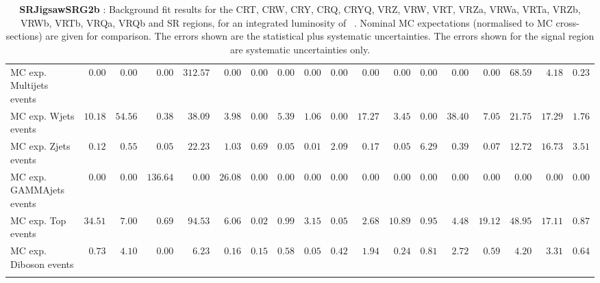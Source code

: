 \begin{table}
{\begin{tabular*}{\textwidth}{@{\extracolsep{\fill}}lrrrrrrrrrrrrrrrrr}
\noalign{\smallskip}\hline\noalign{\smallskip}
        MC exp. Multijets events         & $0.00$          & $0.00$          & $0.00$          & $312.57$          & $0.00$          & $0.00$          & $0.00$          & $0.00$          & $0.00$          & $0.00$          & $0.00$          & $0.00$          & $0.00$          & $0.00$          & $68.59$          & $4.18$          & $0.23$              \\
        MC exp. Wjets events         & $10.18$          & $54.56$          & $0.38$          & $38.09$          & $3.98$          & $0.00$          & $5.39$          & $1.06$          & $0.00$          & $17.27$          & $3.45$          & $0.00$          & $38.40$          & $7.05$          & $21.75$          & $17.29$          & $1.76$              \\
        MC exp. Zjets events         & $0.12$          & $0.55$          & $0.05$          & $22.23$          & $1.03$          & $0.69$          & $0.05$          & $0.01$          & $2.09$          & $0.17$          & $0.05$          & $6.29$          & $0.39$          & $0.07$          & $12.72$          & $16.73$          & $3.51$              \\
        MC exp. GAMMAjets events         & $0.00$          & $0.00$          & $136.64$          & $0.00$          & $26.08$          & $0.00$          & $0.00$          & $0.00$          & $0.00$          & $0.00$          & $0.00$          & $0.00$          & $0.00$          & $0.00$          & $0.00$          & $0.00$          & $0.00$              \\
        MC exp. Top events         & $34.51$          & $7.00$          & $0.69$          & $94.53$          & $6.06$          & $0.02$          & $0.99$          & $3.15$          & $0.05$          & $2.68$          & $10.89$          & $0.95$          & $4.48$          & $19.12$          & $48.95$          & $17.11$          & $0.87$              \\
        MC exp. Diboson events         & $0.73$          & $4.10$          & $0.00$          & $6.23$          & $0.16$          & $0.15$          & $0.58$          & $0.05$          & $0.42$          & $1.94$          & $0.24$          & $0.81$          & $2.72$          & $0.59$          & $4.20$          & $3.31$          & $0.64$              \\
\noalign{\smallskip}\hline\noalign{\smallskip}
\end{tabular*}
}
\caption{{\bf SRJigsawSRG2b} : Background fit results for the CRT, CRW, CRY, CRQ, CRYQ, VRZ, VRW, VRT, VRZa, VRWa, VRTa, VRZb, VRWb, VRTb, VRQa, VRQb and SR regions, for an integrated luminosity of \ourintlumi~\ifb. Nominal MC expectations (normalised to MC cross-sections) are given for comparison. The errors shown are the statistical plus systematic uncertainties. The errors shown for the signal region are systematic uncertainties only.}
\label{table.results.systematics.in.logL.fit.CRT.CRW.CRY.CRQ.CRYQ.VRZ.VRW.VRT.VRZa.VRWa.VRTa.VRZb.VRWb.VRTb.VRQa.VRQb.SR.SRJigsawSRG2b}
\end{table}
%